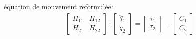 \documentclass[10pt]{beamer}
\begin{document}
\begin{frame}
	\begin{columns}[T]
	\begin{column}{.5\textwidth}\footnotesize
	\begin{alertblock}{équation de mouvement reformulée:}
	  \begin{align}
	  	\begin{bmatrix}
		  H_{11} & H_{12} \\
		  H_{21} & H_{22}
		\end{bmatrix} 
		\cdot
		\begin{bmatrix}
		  \ddot{q}_{1} \\
		  \ddot{q}_{2}
		\end{bmatrix} 
		= 
		\begin{bmatrix}
		  \tau_{1} \\
		  \tau_{2}
		\end{bmatrix} 
		-
		\begin{bmatrix}
		  C_{1} \\
		  C_{2}
		\end{bmatrix} \label{equ_local_eqMvt_2}
		\end{align}
	\end{alertblock}
	\vspace{.8cm}\hyperlink{app_algSpat1}{}
	\end{column}


\end{columns}
\end{frame}
\end{document}
